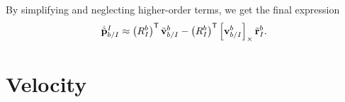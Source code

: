 By simplifying and neglecting higher-order terms, we get the final expression
\begin{equation}
  \dot{\tilde{\mathrm{\mathbf{p}}}}_{b/I}^{I} \approx \left(R_{I}^{b}\right)^{\mathsf{T}}
  \tilde{\mathrm{\mathbf{v}}}_{b/I}^{b} - \left(R_{I}^{b}\right)^{\mathsf{T}}
    \left[ \mathrm{\mathbf{v}}_{b/I}^{b} \right]_{\times} \tilde{\mathrm{\mathbf{r}}}_I^b.
\end{equation}

\section{Velocity}

